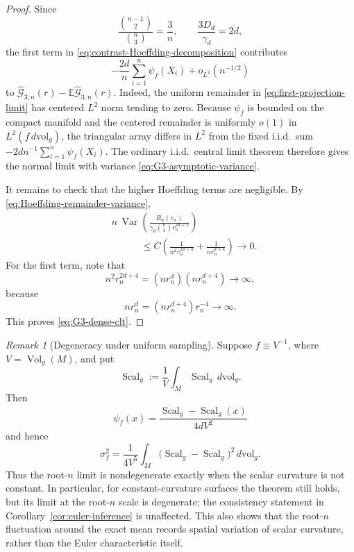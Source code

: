 \documentclass[11pt]{article}
\theoremstyle{remark}
\newtheorem{remark}[theorem]{Remark}
\newcommand{\Vol}{\operatorname{Vol}}
\newcommand{\Scal}{\operatorname{Scal}}
\newcommand{\E}{\mathbb E}
\numberwithin{equation}{section}
\begin{document}
\begin{proof}
Since
\[
\frac{\binom{n-1}{2}}{\binom n3}=\frac3n,
\qquad
\frac{3D_d}{\gamma_d}=2d,
\]
the first term in \eqref{eq:contrast-Hoeffding-decomposition} contributes
\[
-\frac{2d}{n}\sum_{i=1}^n\psi_f(X_i)+o_{L^2}(n^{-1/2})
\]
to
$\widehat{\mathcal G}_{3,n}(r)-
\E\widehat{\mathcal G}_{3,n}(r)$.  Indeed, the uniform remainder in
\eqref{eq:first-projection-limit} has centered $L^2$ norm tending to zero.
Because $\psi_f$ is bounded on the compact manifold and the centered
remainder is uniformly $o(1)$ in $L^2(f\,d\mathrm{vol}_g)$, the triangular
array differs in $L^2$ from the fixed i.i.d.\ sum
$-2d n^{-1}\sum_{i=1}^n\psi_f(X_i)$.  The ordinary i.i.d.\ central limit
theorem therefore gives the normal limit with variance
\eqref{eq:G3-asymptotic-variance}.

It remains to check that the higher Hoeffding terms are negligible.  By
\eqref{eq:Hoeffding-remainder-variance},
\[
\begin{aligned}
&n\,\operatorname{Var}\left(
\frac{R_n(r_n)}
{\gamma_d\binom n3r_n^{2d+2}}
\right)\\
&\hspace{3em}\le
C\left(
\frac1{n^2r_n^{2d+4}}+
\frac1{nr_n^{d+4}}
\right)\longrightarrow0.
\end{aligned}
\]
For the first term, note that
\[
n^2r_n^{2d+4}
=
(n r_n^d)(n r_n^{d+4})
\longrightarrow\infty,
\]
because
\[
n r_n^d
=
(n r_n^{d+4})r_n^{-4}
\longrightarrow\infty.
\]
This proves \eqref{eq:G3-dense-clt}.
\end{proof}

\begin{remark}[Degeneracy under uniform sampling]
Suppose $f\equiv V^{-1}$, where $V=\Vol_g(M)$, and put
\[
\overline{\Scal}_g:=\frac1V\int_M\Scal_g\,d\mathrm{vol}_g.
\]
Then
\[
\psi_f(x)=\frac{\overline{\Scal}_g-\Scal_g(x)}{4dV^2}
\]
and hence
\begin{equation}
\sigma_f^2
=\frac1{4V^5}\int_M
\bigl(\Scal_g-\overline{\Scal}_g\bigr)^2\,d\mathrm{vol}_g.
\label{eq:uniform-asymptotic-variance}
\end{equation}
Thus the root-$n$ limit is nondegenerate exactly when the scalar curvature is
not constant.  In particular, for constant-curvature surfaces the theorem
still holds, but its limit at the root-$n$ scale is degenerate; the consistency
statement in Corollary~\ref{cor:euler-inference} is unaffected.  This
also shows that the root-$n$ fluctuation around the exact mean records spatial
variation of scalar curvature, rather than the Euler characteristic itself.
\end{remark}
\end{document}
